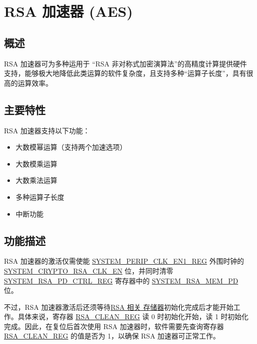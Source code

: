 \documentclass[main\_\_CN.tex]{subfiles}
\begin{document}
\setchineseformatting

\ifglobal
\else
    \listoftodos
    {\let\clearpage\relax \listofdonetodos}
    \tableofcontents
\fi



\hypertarget{rsa}{}
\chapter{RSA 加速器 (AES)}\label{mod:rsa}


\section{概述}

RSA 加速器可为多种运用于 “RSA 非对称式加密演算法”的高精度计算提供硬件支持，能够极大地降低此类运算的软件复杂度，且支持多种“运算子长度”，具有很高的运算效率。

\section{主要特性}

RSA 加速器支持以下功能：
\begin{itemize}
    \item 大数模幂运算（支持两个加速选项）
    \item 大数模乘运算
    \item 大数乘法运算
    \item 多种运算子长度
    \item 中断功能
\end{itemize}

\section{功能描述}

RSA 加速器的激活仅需使能 \hyperref[regdesc:SYSTEMPERIPCLKEN1REG]{SYSTEM\_PERIP\_CLK\_EN1\_REG} 外围时钟的 \hyperref[fielddesc:SYSTEMCRYPTORSACLKEN]{SYSTEM\_CRYPTO\_RSA\_CLK\_EN} 位，并同时清零 \hyperref[regdesc:SYSTEMRSAPDCTRLREG]{SYSTEM\_RSA\_PD\_CTRL\_REG} 寄存器中的 \hyperref[fielddesc:SYSTEMRSAMEMPD]{SYSTEM\_RSA\_MEM\_PD} 位。

不过，RSA 加速器激活后还须等待\hyperref[Memorylist]{RSA 相关 存储器}初始化完成后才能开始工作。具体来说，寄存器 \hyperref[regdesc:RSACLEANREG]{RSA\_CLEAN\_REG} 读 0 时初始化开始，读 1 时初始化完成。因此，在复位后首次使用 RSA 加速器时，软件需要先查询寄存器 \hyperref[regdesc:RSACLEANREG]{RSA\_CLEAN\_REG} 的值是否为 1，以确保 RSA 加速器可正常工作。
\end{document}
